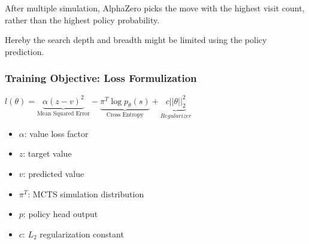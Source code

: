 \documentclass[
../EiKI_Summary.tex,
]
{subfiles}
\begin{document}
After multiple simulation, AlphaZero picks the move with the highest visit count, rather than the highest policy probability.

Hereby the search depth and breadth might be limited using the policy prediction.

\subsubsection{Training Objective: Loss Formulization}
\begin{csmb*}
    $l(\theta) = \underbrace{\alpha(z-v)^2}_{\text{Mean Squared Error}}-\underbrace{\pi^T\log p_{\theta}(s)}_{\text{Cross Entropy}} + \underbrace{c||\theta||_2^2}_{Regularizer}$
\end{csmb*}

\begin{itemize}
    \item $\alpha$: value loss factor
    \item $z$: target value
    \item $v$: predicted value
    \item $\pi^T$: MCTS simulation distribution
    \item $p$: policy head output
    \item $c$: $L_2$ regularization constant
\end{itemize}
\end{document}
